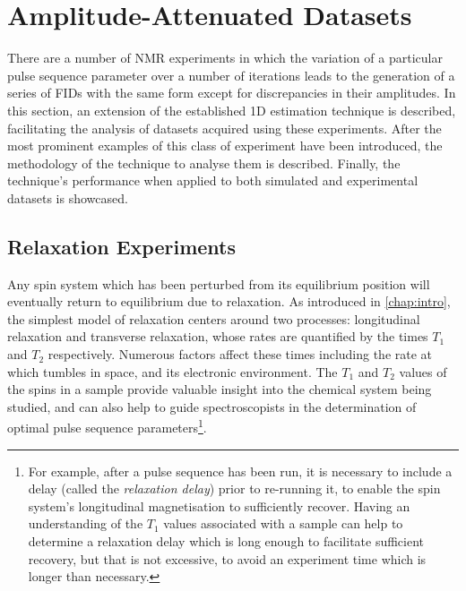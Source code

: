 \section{Amplitude-Attenuated Datasets}
\label{sec:seq}
There are a number of \ac{NMR} experiments in which the
variation of a particular pulse sequence parameter over a number of iterations
leads to the generation of a series of
\acp{FID} with the same form except for discrepancies in their amplitudes.
In this section, an extension of the established \ac{1D} estimation
technique is described, facilitating the analysis of datasets acquired using
these experiments.
After the most prominent examples of this class of experiment have been
introduced, the methodology of the technique to analyse them is described.
Finally, the technique's performance when applied to both simulated and
experimental datasets is showcased.

\subsection{Relaxation Experiments}
\label{subsec:relaxation_experiments}
Any spin system which has been perturbed from its equilibrium position will
eventually return to equilibrium due to relaxation. As introduced in
\cref{chap:intro}, the simplest model of relaxation centers around two
processes: longitudinal relaxation and transverse relaxation, whose rates are
quantified by the times $T_1$ and  $T_2$ respectively.
Numerous factors affect these times including the rate at which
\label{corr:spin-molecule}%
tumbles in space, and its electronic environment.
The $T_1$ and $T_2$ values of the spins in a sample provide valuable insight
into the chemical system being studied, and can also help to guide
spectroscopists in the determination of optimal pulse sequence
parameters\footnote{
    For example, after a pulse sequence has been run, it is necessary to include a
    delay (called the \emph{relaxation delay}) prior to
    re-running it, to enable the spin system's longitudinal magnetisation to
    sufficiently recover. Having an understanding of the $T_1$ values
    associated with a sample can help to determine a relaxation delay which is
    long enough to facilitate sufficient recovery, but that is not excessive, to
    avoid an experiment time which is longer than necessary.
}.

